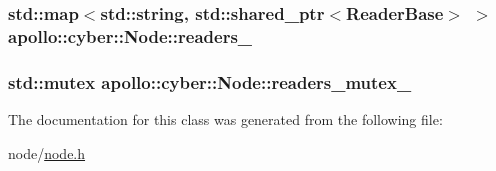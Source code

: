 \hypertarget{classapollo_1_1cyber_1_1Node_ab62dc14e42c5c1585405690d9af1401b}{
\subsubsection[{readers\-\_\-}]{\setlength{\rightskip}{0pt plus 5cm}std\-::map$<$std\-::string, std\-::shared\-\_\-ptr$<${\bf Reader\-Base}$>$ $>$ apollo\-::cyber\-::\-Node\-::readers\-\_\-\hspace{0.3cm}{\ttfamily [private]}}}\label{classapollo_1_1cyber_1_1Node_ab62dc14e42c5c1585405690d9af1401b}
\hypertarget{classapollo_1_1cyber_1_1Node_a1da65038b46901c730a9b50a1f0f38d6}{
\subsubsection[{readers\-\_\-mutex\-\_\-}]{\setlength{\rightskip}{0pt plus 5cm}std\-::mutex apollo\-::cyber\-::\-Node\-::readers\-\_\-mutex\-\_\-\hspace{0.3cm}{\ttfamily [private]}}}\label{classapollo_1_1cyber_1_1Node_a1da65038b46901c730a9b50a1f0f38d6}


The documentation for this class was generated from the following file\-:\begin{DoxyCompactItemize}
\item 
node/\hyperlink{node_8h}{node.\-h}\end{DoxyCompactItemize}
